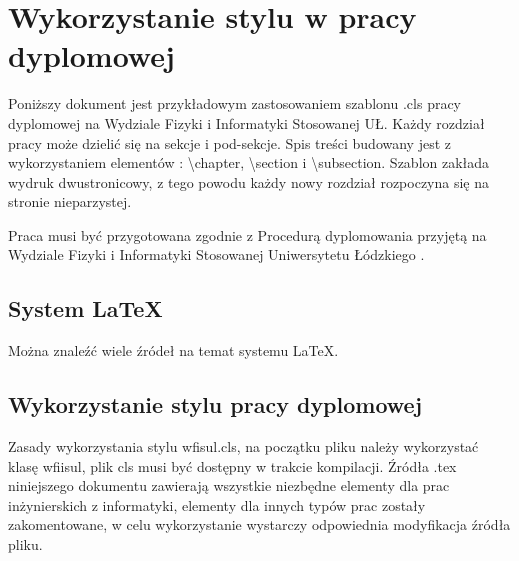 \documentclass{wfiisul}
\begin{document}

\nralbumu{****}

\promotor{****}
\katedra{****}


\specjalizacja{****}






\stronatytulowa


\chapter{Wykorzystanie stylu w pracy dyplomowej}

Poniższy dokument jest przykładowym zastosowaniem szablonu .cls pracy dyplomowej na Wydziale Fizyki i Informatyki Stosowanej UŁ. Każdy rozdział pracy może dzielić się na sekcje i pod-sekcje. Spis treści budowany jest z wykorzystaniem elementów : {\textbackslash}chapter, {\textbackslash}section i {\textbackslash}subsection. Szablon zakłada wydruk dwustronicowy, z tego powodu każdy nowy rozdział rozpoczyna się na stronie nieparzystej.

Praca musi być przygotowana zgodnie z Procedurą dyplomowania przyjętą na Wydziale Fizyki i Informatyki Stosowanej Uniwersytetu Łódzkiego \cite{Procedura_dyplomowania}.
\section{System \LaTeX}
Można znaleźć wiele źródeł na temat systemu \LaTeX \cite{latex_wiki}.

\section{Wykorzystanie stylu pracy dyplomowej}
Zasady wykorzystania stylu wfisul.cls, na początku pliku należy wykorzystać klasę wfiisul, plik cls musi być dostępny w trakcie kompilacji. Źródła .tex niniejszego dokumentu zawierają wszystkie niezbędne elementy dla prac inżynierskich z informatyki, elementy dla innych typów prac zostały zakomentowane, w celu wykorzystanie wystarczy odpowiednia modyfikacja źródła pliku.
\end{document}
